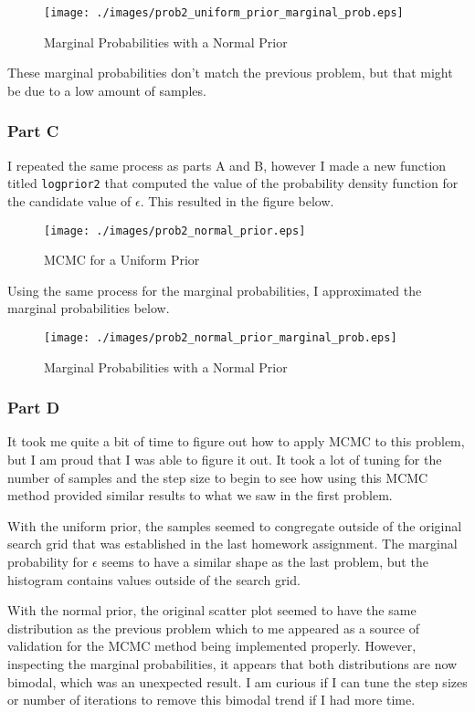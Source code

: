 \begin{figure}[h] 
	\centering
	\texttt{[image: ./images/prob2\_uniform\_prior\_marginal\_prob.eps]}
	\caption{Marginal Probabilities with a Normal Prior}
	\label{fig: prob2 mcmc uniform prior marginal prob}
\end{figure}
\FloatBarrier

These marginal probabilities don't match the previous problem, but that might be due to a low amount of samples.


\subsubsection{Part C}

I repeated the same process as parts A and B, however I made a new function titled \verb|logprior2| that computed the value of the probability density function for the candidate value of $\epsilon$. This resulted in the figure below. 

\begin{figure}[h] 
	\centering
	\texttt{[image: ./images/prob2\_normal\_prior.eps]}
	\caption{MCMC for a Uniform Prior}
	\label{fig: prob2 mcmc normal prior}
\end{figure}
\FloatBarrier

Using the same process for the marginal probabilities, I approximated the marginal probabilities below. 

\begin{figure}[h] 
	\centering
	\texttt{[image: ./images/prob2\_normal\_prior\_marginal\_prob.eps]}
	\caption{Marginal Probabilities with a Normal Prior}
	\label{fig: prob2 mcmc normal prior marginal prob}
\end{figure}
\FloatBarrier


\subsubsection{Part D}

It took me quite a bit of time to figure out how to apply MCMC to this problem, but I am proud that I was able to figure it out. It took a lot of tuning for the number of samples and the step size to begin to see how using this MCMC method provided similar results to what we saw in the first problem. 

With the uniform prior, the samples seemed to congregate outside of the original search grid that was established in the last homework assignment. The marginal probability for $\epsilon$ seems to have a similar shape as the last problem, but the histogram contains values outside of the search grid. 

With the normal prior, the original scatter plot seemed to have the same distribution as the previous problem which to me appeared as a source of validation for the MCMC method being implemented properly. However, inspecting the marginal probabilities, it appears that both distributions are now bimodal, which was an unexpected result. I am curious if I can tune the step sizes or number of iterations to remove this bimodal trend if I had more time. 

